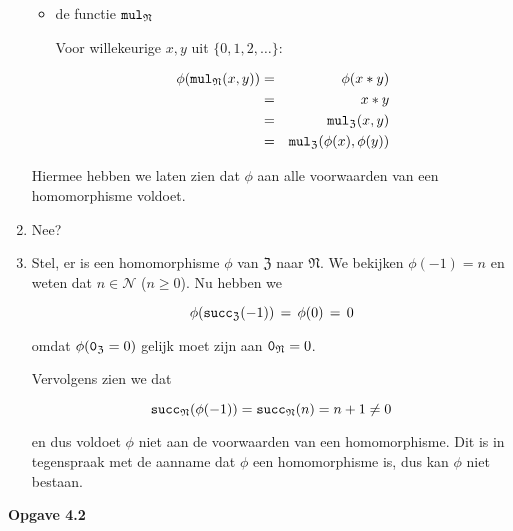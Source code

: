 \documentclass[a4paper,11pt]{article}
\begin{document}
\begin{enumerate}
\begin{itemize}
\item{de functie $\verb|mul|_{\mathfrak{N}}$}

  Voor willekeurige $x,y$ uit $\{0,1,2,\ldots\}$:

  \begin{eqnarray*}
    \phi(\verb|mul|_{\mathfrak{N}}(x,y)) & = & \phi(x*y) \\
                                         & = & x*y \\
                                         & = & \verb|mul|_{\mathfrak{Z}}(x,y) \\
                                         & = & \verb|mul|_{\mathfrak{Z}}(\phi(x),\phi(y))
  \end{eqnarray*}

\end{itemize}

Hiermee hebben we laten zien dat $\phi$ aan alle voorwaarden van een
homomorphisme voldoet.

\item %

Nee?

\item %

Stel, er is een homomorphisme $\phi$ van $\mathfrak{Z}$ naar
$\mathfrak{N}$. We bekijken $\phi(-1)=n$ en weten dat $n \in \mathcal{N}$ ($n
\ge 0$). Nu hebben we

\begin{displaymath}
\phi(\verb|succ|_{\mathfrak{Z}}(-1)) \, = \, \phi(0) \, = \, 0
\end{displaymath}

omdat $\phi(\verb|0|_{\mathfrak{Z}}=0)$ gelijk moet zijn aan
$\verb|0|_{\mathfrak{N}} = 0$.

Vervolgens zien we dat

\begin{displaymath}
\verb|succ|_{\mathfrak{N}}(\phi(-1)) = \verb|succ|_{\mathfrak{N}}(n) = n+1 \ne 0
\end{displaymath}

en dus voldoet $\phi$ niet aan de voorwaarden van een homomorphisme. Dit is in
tegenspraak met de aanname dat $\phi$ een homomorphisme is, dus kan $\phi$ niet
bestaan.\\[2em]

\end{enumerate}


{\bf Opgave 4.2}
\end{document}
